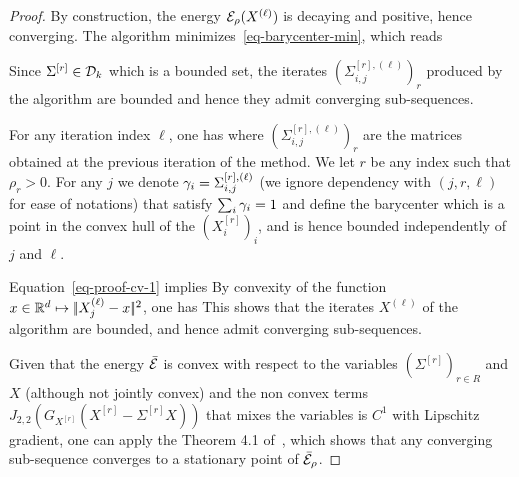 \begin{proof}
	By construction, the energy $\mathcal{E}_\rho(X^{(\ell)})$ is decaying and positive, hence converging.  The algorithm minimizes~\eqref{eq-barycenter-min}, which reads

	Since $\Sigma^{[r]} \in \mathcal{D}_k$ which is a bounded set, the iterates $( \Sigma_{i,j}^{[r],(\ell)} )_r$ produced by the algorithm are bounded and hence they admit converging sub-sequences.
	
	For any iteration index $\ell$, one has
	where $( \Sigma_{i,j}^{[r],(\ell)} )_r$ are the matrices obtained at the previous iteration of the method. We let $r$ be any index such that $\rho_r>0$. For any $j$ we denote  $\gamma_i = \Sigma_{i,j}^{[r],(\ell)}$ (we ignore dependency with $(j,r,\ell)$ for ease of notations) that satisfy $\sum_i \gamma_i=1$  and define the barycenter 	
	which is a point in the convex hull of the $(X_i^{[r]})_i$, and is hence bounded independently of $j$ and $\ell$.
	
	Equation~\eqref{eq-proof-cv-1} implies
	By convexity of the function $x \in \mathbb{R}^d \mapsto |\!|  X_j^{(\ell)} - x  |\!|^2$, one has
	This shows that the iterates $X^{(\ell)}$ of the algorithm are bounded, and hence admit converging sub-sequences.
		
	
	Given that the energy $\bar {\mathcal{E}}$ is convex with respect to the variables $(\Sigma^{[r]})_{r \in R}$ and $X$ (although not jointly convex) and the non convex terms $J_{2,2}( G_{X^{[r]}} (X^{[r]} - \Sigma^{[r]} X) )$ that mixes the variables is $C^1$ with Lipschitz gradient, one can apply the Theorem 4.1 of~\cite{tseng-proximal}, which shows that any converging sub-sequence converges to a stationary point of $\bar{\mathcal{E}}_\rho$.   
\end{proof}



